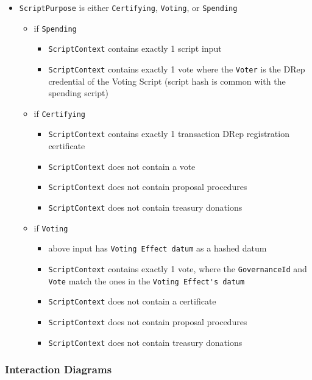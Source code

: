 \documentclass{article}
\begin{document}
\begin{itemize}
  \item \verb|ScriptPurpose| is either \verb|Certifying|, \verb|Voting|, or \verb|Spending|
        \begin{itemize}
          \item if \verb|Spending|
                \begin {itemize}

          \item \verb|ScriptContext| contains exactly 1 script input
          \item \verb|ScriptContext| contains exactly 1 vote where the \verb|Voter| is the DRep credential of the Voting Script (script hash is common with the spending script)
        \end{itemize}
  \item if \verb|Certifying|
        \begin{itemize}
          \item \verb|ScriptContext| contains exactly 1 transaction DRep registration certificate
          \item \verb|ScriptContext| does not contain a vote
          \item \verb|ScriptContext| does not contain proposal procedures
          \item \verb|ScriptContext| does not contain treasury donations
        \end{itemize}
  \item if \verb|Voting|
        \begin{itemize}
          \item above input has \verb|Voting Effect datum| as a hashed datum
          \item \verb|ScriptContext| contains exactly 1 vote, where the \verb|GovernanceId| and \verb|Vote| match the ones in the \verb|Voting Effect's datum|
          \item \verb|ScriptContext| does not contain a certificate
          \item \verb|ScriptContext| does not contain proposal procedures
          \item \verb|ScriptContext| does not contain treasury donations
        \end{itemize}


\end{itemize}
\end{itemize}

\subsubsection*{Interaction Diagrams}
\end{document}
